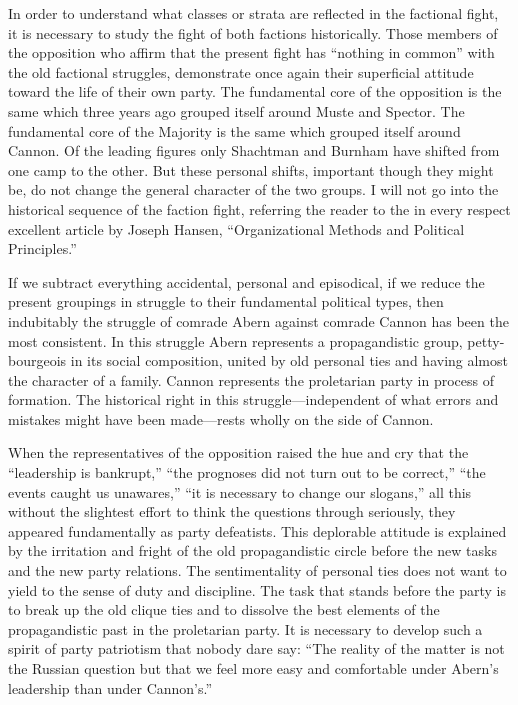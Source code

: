 In order to understand what classes or strata are reflected in the factional fight, it is necessary to study the fight of both factions historically. Those members of the opposition who affirm that the present fight has “nothing in common” with the old factional struggles, demonstrate once again their superficial attitude toward the life of their own party. The fundamental core of the opposition is the same which three years ago grouped itself around Muste and Spector. The fundamental core of the Majority is the same which grouped itself around Cannon. Of the leading figures only Shachtman and Burnham have shifted from one camp to the other. But these personal shifts, important though they might be, do not change the general character of the two groups. I will not go into the historical sequence of the faction fight, referring the reader to the in every respect excellent article by Joseph Hansen, ``Organizational Methods and Political Principles.''

If we subtract everything accidental, personal and episodical, if we reduce the present groupings in struggle to their fundamental political types, then indubitably the struggle of comrade Abern against comrade Cannon has been the most consistent. In this struggle Abern represents a propagandistic group, petty-bourgeois in its social composition, united by old personal ties and having almost the character of a family. Cannon represents the proletarian party in process of formation. The historical right in this struggle---independent of what errors and mistakes might have been made---rests wholly on the side of Cannon.

When the representatives of the opposition raised the hue and cry that the “leadership is bankrupt,” “the prognoses did not turn out to be correct,” “the events caught us unawares,” “it is necessary to change our slogans,” all this without the slightest effort to think the questions through seriously, they appeared fundamentally as party defeatists. This deplorable attitude is explained by the irritation and fright of the old propagandistic circle before the new tasks and the new party relations. The sentimentality of personal ties does not want to yield to the sense of duty and discipline. The task that stands before the party is to break up the old clique ties and to dissolve the best elements of the propagandistic past in the proletarian party. It is necessary to develop such a spirit of party patriotism that nobody dare say: “The reality of the matter is not the Russian question but that we feel more easy and comfortable under Abern’s leadership than under Cannon’s.”


